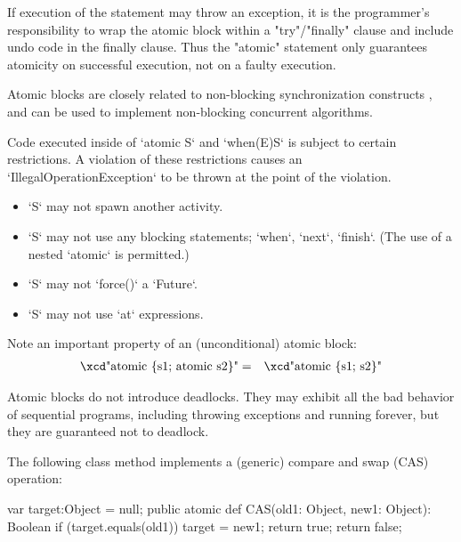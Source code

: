 If execution of the statement may throw an exception, it is
the programmer's responsibility to wrap the atomic block within a
\xcd"try"/\xcd"finally" clause and include undo code in the finally
clause. Thus the \xcd"atomic" statement only guarantees atomicity on
successful execution, not on a faulty execution.




Atomic blocks are closely related to non-blocking synchronization
constructs \cite{herlihy91waitfree}, and can be used to implement 
non-blocking concurrent algorithms.

Code executed inside of \xcd`atomic S` and \xcd`when(E)S` is subject
to certain restrictions. A violation of these restrictions causes an 
\xcd`IllegalOperationException` to be thrown at the point of the violation.

\begin{itemize}
\item \xcd`S` may not spawn another activity.
\item \xcd`S` may not use any blocking statements; \xcd`when`, \xcd`next`,
      \xcd`finish`.  (The use of a nested \xcd`atomic` is permitted.)
\item \xcd`S` may not \xcd`force()` a \xcd`Future`. 
\item \xcd`S` may not use \xcd`at` expressions.
\end{itemize}




Note an important property of an (unconditional) atomic block:
\begin{eqnarray}
\mbox{\xcd"atomic \{s1; atomic s2\}"} &=& \mbox{\xcd"atomic \{s1; s2\}"}
\end{eqnarray}

Atomic blocks do not introduce deadlocks.    They may exhibit all the bad
behavior of sequential programs, including throwing exceptions and running
forever, but they are guaranteed not to deadlock.



\begin{ex}
The following class method implements a (generic) compare and swap (CAS) operation:


\begin{xten}
var target:Object = null;
public atomic def CAS(old1: Object, new1: Object): Boolean {
   if (target.equals(old1)) {
     target = new1;
     return true;
   }
   return false;
}
\end{xten}
\end{ex}



